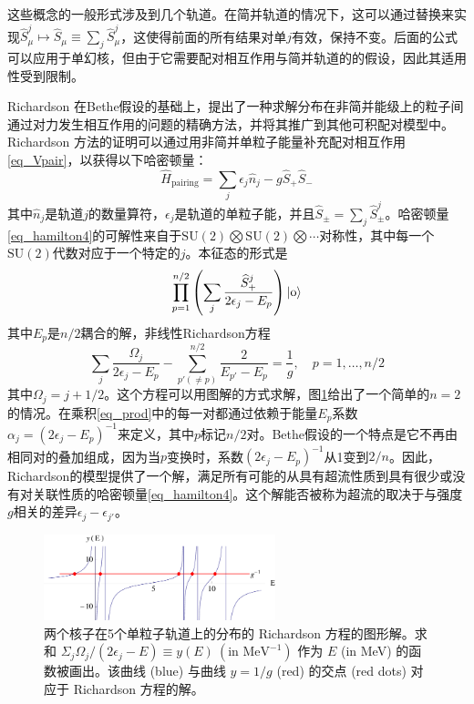 这些概念的一般形式涉及到几个轨道。在简并轨道的情况下，这可以通过替换来实现$\widehat{S}_\mu^j\mapsto\widehat{S}_\mu\equiv\sum_j\widehat{S}^j_\mu$，这使得前面的所有结果对单$j$有效，保持不变。后面的公式可以应用于单幻核，但由于它需要配对相互作用与简并轨道的的假设，因此其适用性受到限制。

Richardson 在Bethe假设的基础上，提出了一种求解分布在非简并能级上的粒子间通过对力发生相互作用的问题的精确方法，并将其推广到其他可积配对模型中。Richardson 方法的证明可以通过用非简并单粒子能量补充配对相互作用\ref{eq_Vpair}，以获得以下哈密顿量：
\begin{equation}\label{eq_hamilton4}
\widehat{H}_\textrm{pairing}=\sum_j\epsilon_j\widehat{n}_j-g\widehat{S}_+\widehat{S}_-
\end{equation}
其中$\widehat{n}_j$是轨道$j$的数量算符，$\epsilon_j$是轨道的单粒子能，并且$\widehat{S}_\pm=\sum_j\widehat{S}^j_\pm$。哈密顿量\ref{eq_hamilton4}的可解性来自于$\textrm{SU}(2)\bigotimes\textrm{SU}(2)\bigotimes\cdots$对称性，其中每一个$\textrm{SU}(2)$代数对应于一个特定的$j$。本征态的形式是
\begin{equation}\label{eq_prod}
\prod_{p=1}^{n/2}\left(\sum_j\frac{\widehat{S}_+^j}{2\epsilon_j-E_p}\right)|{\rm o}\rangle
\end{equation}
其中$E_p$是$n/2$耦合的解，非线性Richardson方程
\begin{equation}
\sum_j\frac{\Omega_j}{2\epsilon_j-E_p}-\sum_{p'(\ne p)}^{n/2}\frac{2}{E_{p'}-E_p}=\frac{1}{g},\quad p=1,\ldots,n/2
\end{equation}
其中$\Omega_j=j+1/2$。这个方程可以用图解的方式求解，图\ref{F_richardson}给出了一个简单的$n=2$的情况。在乘积\ref{eq_prod}中的每一对都通过依赖于能量$E_p$系数$\alpha_j=(2\epsilon_j-E_p)^{-1}$来定义，其中$p$标记$n/2$对。Bethe假设的一个特点是它不再由相同对的叠加组成，因为当$p$变换时，系数$(2\epsilon_j-E_p)^{-1}$从1变到$2/n$。因此，Richardson的模型提供了一个解，满足所有可能的从具有超流性质到具有很少或没有对关联性质的哈密顿量\ref{eq_hamilton4}。这个解能否被称为超流的取决于与强度$g$相关的差异$\epsilon_j-\epsilon_{j'}$。
\begin{figure}[H]
\centering
\includegraphics[width=0.6\textwidth]{figure/F_richardson.png}
\caption{两个核子在5个单粒子轨道上的分布的 Richardson 方程的图形解。求和 $\Sigma_j\Omega_j/(2\epsilon_j-E)\equiv y(E)\ (\textrm{in MeV}^{-1})$ 作为 $E$ (in MeV) 的函数被画出。该曲线 (blue) 与曲线 ${y=1/g}$ (red) 的交点 (red dots) 对应于 Richardson 方程的解。\label{F_richardson}}
\end{figure}


